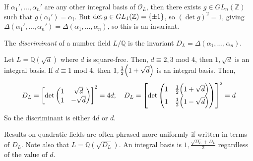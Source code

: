 \begin{remark}
    If \( \alpha_1', \dots, \alpha_n' \) are any other integral basis of \( \mathcal O_L \), then there exists \( g \in GL_n(\mathbb Z) \) such that \( g(\alpha_i') = \alpha_i \).
    But \( \det g \in GL_1(\mathbb Z) = \qty{\pm 1} \), so \( (\det g)^2 = 1 \), giving \( \Delta(\alpha_1', \dots, \alpha_n') = \Delta(\alpha_1, \dots, \alpha_n) \), so this is an invariant.
\end{remark}
\begin{definition}
    The \emph{discriminant} of a number field \( L / \mathbb Q \) is the invariant \( D_L = \Delta(\alpha_1, \dots, \alpha_n) \).
\end{definition}
\begin{example}
    Let \( L = \mathbb Q(\sqrt{d}) \) where \( d \) is square-free.
    Then, \( d \equiv 2, 3 \) mod 4, then \( 1, \sqrt{d} \) is an integral basis.
    If \( d \equiv 1 \) mod 4, then \( 1, \frac{1}{2}\qty(1+\sqrt{d}) \) is an integral basis.
    Then,
    \[ D_L = \qty[\det \begin{pmatrix}
        1 & \sqrt{d} \\
        1 & -\sqrt{d}
    \end{pmatrix}]^2 = 4d;\quad D_L = \qty[\det \begin{pmatrix}
        1 & \frac{1}{2}\qty(1 + \sqrt{d}) \\
        1 & \frac{1}{2}\qty(1 - \sqrt{d})
    \end{pmatrix}]^2 = d \]
    So the discriminant is either \( 4d \) or \( d \).
\end{example}
\begin{remark}
    Results on quadratic fields are often phrased more uniformly if written in terms of \( D_L \).
    Note also that \( L = \mathbb Q(\sqrt{D_L}) \).
    An integral basis is \( 1, \frac{\sqrt{D_L} + D_L}{2} \) regardless of the value of \( d \).
\end{remark}
